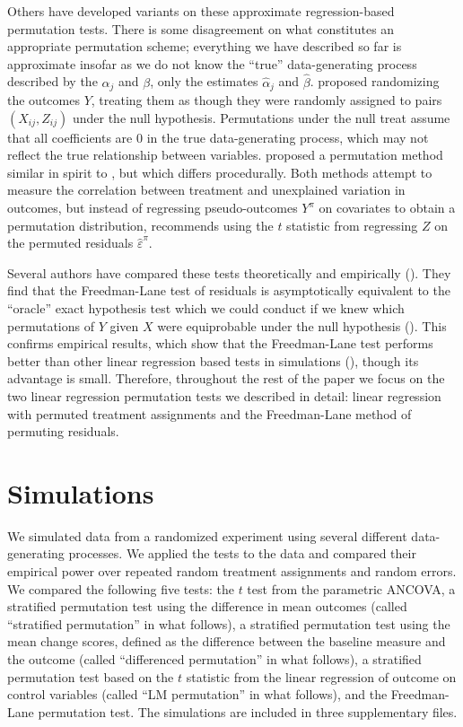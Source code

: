 \documentclass[12pt]{article}
\begin{document}
Others have developed variants on these approximate regression-based permutation tests. 
There is some disagreement on what constitutes an appropriate permutation scheme;
everything we have described so far is approximate insofar as we do not know the ``true'' data-generating process described by the $\alpha_j$ and $\beta$,
only the estimates $\hat{\alpha}_j$ and $\hat{\beta}$.
\cite{manly_randomization_2006} proposed randomizing the outcomes $Y$, treating them as though they were randomly assigned to pairs $(X_{ij}, Z_{ij})$ under the null hypothesis.
Permutations under the null treat assume that all coefficients are 0 in the true data-generating process, which may not reflect the true relationship between variables.
\cite{kennedy_randomization_1995} proposed a permutation method similar in spirit to \cite{freedman_nonstochastic_1983}, but which differs procedurally.
Both methods attempt to measure the correlation between treatment and unexplained variation in outcomes, but
instead of regressing pseudo-outcomes $Y^\pi$ on covariates to obtain a permutation distribution, \cite{kennedy_randomization_1995} recommends using the $t$ statistic from regressing $Z$ on the permuted residuals $\hat{\varepsilon}^\pi$. 

Several authors have compared these tests theoretically and empirically (\cite{anderson_empirical_1999, anderson_permutation_2001, kennedy_randomization_1996}).
They find that the Freedman-Lane test of residuals is asymptotically equivalent to the ``oracle'' exact hypothesis test which we could conduct if we knew which permutations of $Y$ given $X$ were equiprobable under the null hypothesis (\cite{anderson_permutation_2001}).
This confirms empirical results, which show that the Freedman-Lane test performs better than other linear regression based tests in simulations (\cite{anderson_empirical_1999}), though its advantage is small.
Therefore, throughout the rest of the paper we focus on the two linear regression permutation tests we described in detail: linear regression with permuted treatment assignments and the Freedman-Lane method of permuting residuals.


\section{Simulations}\label{sec:simulations}

We simulated data from a randomized experiment using several different data-generating processes.
We applied the tests to the data and compared their empirical power over repeated random treatment assignments and random errors.
We compared the following five tests:
the $t$ test from the parametric ANCOVA,
a stratified permutation test using the difference in mean outcomes
 (called ``stratified permutation'' in what follows),
a stratified permutation test using the mean change scores, defined as the difference between the baseline measure and the outcome (called ``differenced permutation'' in what follows),
a stratified permutation test based on the $t$ statistic from the linear regression of outcome on control variables (called ``LM permutation'' in what follows),
and the Freedman-Lane permutation test.
The simulations are included in three supplementary files.
\end{document}
